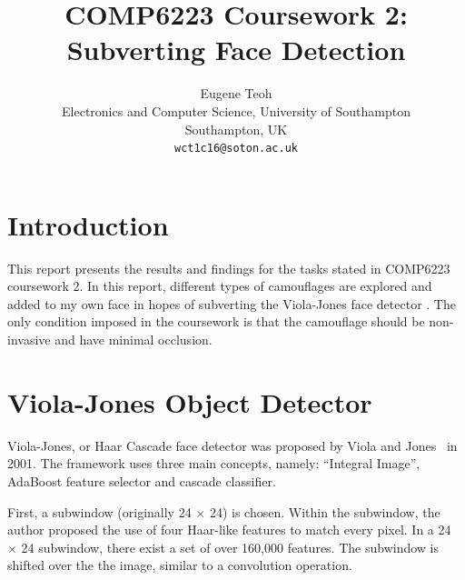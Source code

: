 \documentclass[10pt,twocolumn,letterpaper]{article}
\begin{document}
\title{COMP6223 Coursework 2: Subverting Face Detection}

\author{Eugene Teoh\\
Electronics and Computer Science, University of Southampton\\
Southampton, UK\\
{\tt\small wct1c16@soton.ac.uk}
}

\maketitle


   

\section{Introduction}


This report presents the results and findings for the tasks stated in COMP6223 coursework 2. In this report, different types of camouflages are explored and added to my own face in hopes of subverting the Viola-Jones face detector \cite{viola-jones}. The only condition imposed in the coursework is that the camouflage should be non-invasive and have minimal occlusion.

\section{Viola-Jones Object Detector}

Viola-Jones, or Haar Cascade face detector was proposed by Viola and Jones~\cite{viola-jones} in 2001. The framework uses three main concepts, namely: ``Integral Image'', AdaBoost feature selector and cascade classifier.

First, a subwindow (originally 24 $\times$ 24) is chosen. Within the subwindow, the author proposed the use of four Haar-like features to match every pixel. In a 24 $\times$ 24 subwindow, there exist a set of over 160,000 features. The subwindow is shifted over the the image, similar to a convolution operation.
\end{document}

